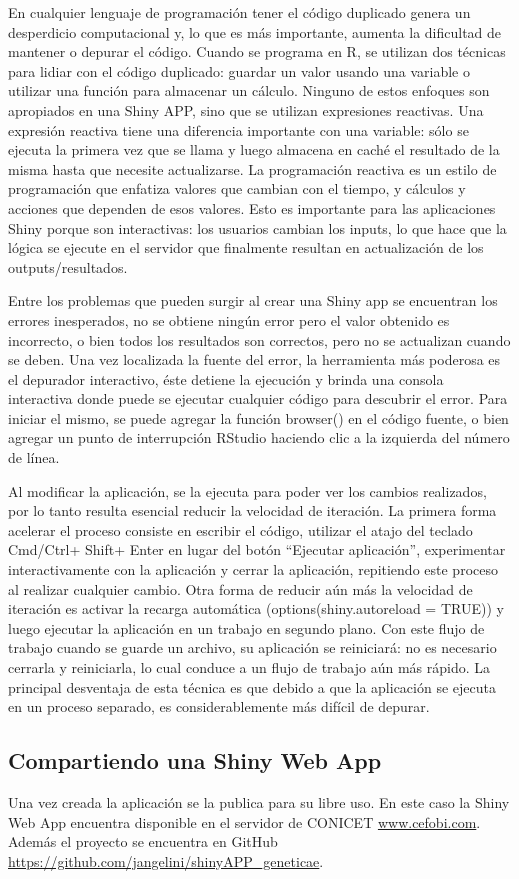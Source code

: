 En cualquier lenguaje de programación tener el código duplicado genera un desperdicio computacional y, lo que es más importante, aumenta la dificultad de mantener o depurar el código. Cuando se programa en R, se utilizan dos técnicas para lidiar con el código duplicado: guardar un valor usando una variable o utilizar una función para almacenar un cálculo. Ninguno de estos enfoques son apropiados en una Shiny APP, sino que se utilizan expresiones reactivas. Una expresión reactiva tiene una diferencia importante con una variable: sólo se ejecuta la primera vez que se llama y luego almacena en caché el resultado de la misma hasta que necesite actualizarse. La programación reactiva es un estilo de programación que enfatiza valores que cambian con el tiempo, y cálculos y acciones que dependen de esos valores. Esto es importante para las aplicaciones Shiny porque son interactivas: los usuarios cambian los inputs, lo que hace que la lógica se ejecute en el servidor que finalmente resultan en actualización de los outputs/resultados.

Entre los problemas que pueden surgir al crear una Shiny app se encuentran los errores inesperados, no se obtiene ningún error pero el valor obtenido es incorrecto, o bien todos los resultados son correctos, pero no se actualizan cuando se deben. Una vez localizada la fuente del error, la herramienta más poderosa es el depurador interactivo, éste detiene la ejecución y brinda una consola interactiva donde puede se ejecutar cualquier código para descubrir el error. Para iniciar el mismo, se puede agregar la función browser() en el código fuente, o bien agregar un punto de interrupción RStudio haciendo clic a la izquierda del número de línea.

Al modificar la aplicación, se la ejecuta para poder ver los cambios realizados, por lo tanto resulta esencial reducir la velocidad de iteración. La primera forma acelerar el proceso consiste en escribir el código, utilizar el atajo del teclado Cmd/Ctrl+ Shift+ Enter en lugar del botón ``Ejecutar aplicación'', experimentar interactivamente con la aplicación y cerrar la aplicación, repitiendo este proceso al realizar cualquier cambio. Otra forma de reducir aún más la velocidad de iteración es activar la recarga automática (options(shiny.autoreload = TRUE)) y luego ejecutar la aplicación en un trabajo en segundo plano. Con este flujo de trabajo cuando se guarde un archivo, su aplicación se reiniciará: no es necesario cerrarla y reiniciarla, lo cual conduce a un flujo de trabajo aún más rápido. La principal desventaja de esta técnica es que debido a que la aplicación se ejecuta en un proceso separado, es considerablemente más difícil de depurar.


\subsection{Compartiendo una Shiny Web App}

Una vez creada la aplicación se la publica para su libre uso. En este caso la Shiny Web App encuentra disponible en el servidor de CONICET \url{www.cefobi.com}. Además el proyecto se encuentra en GitHub \url{https://github.com/jangelini/shinyAPP_geneticae}. 
